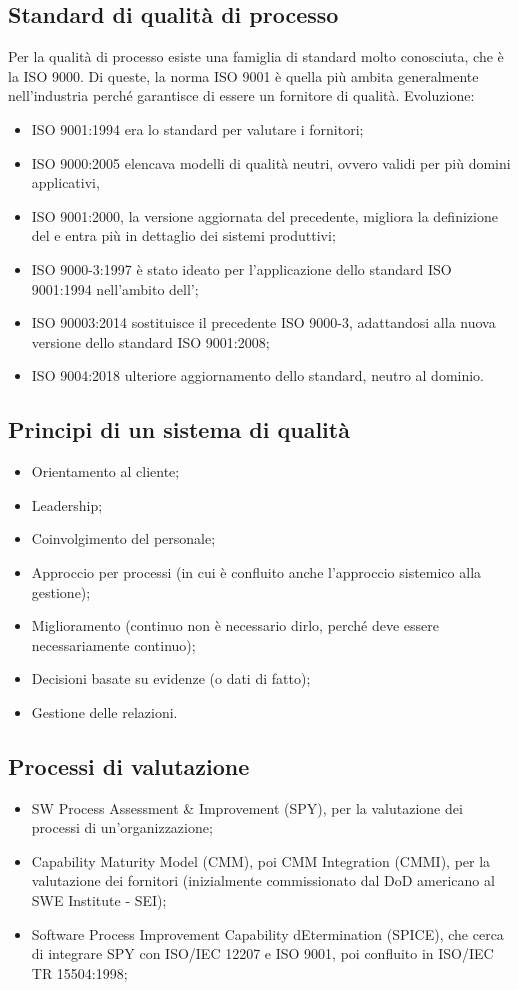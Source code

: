 \documentclass[../main]{subfiles}
\begin{document}
\subsection{Standard di qualità di processo}
Per la qualità di processo esiste una famiglia di standard molto conosciuta, che è la ISO 9000. Di queste, la norma ISO 9001 è quella più ambita generalmente nell'industria perché garantisce di essere un fornitore di qualità.
Evoluzione:
\begin{itemize}
    \item ISO 9001:1994 era lo standard per valutare i fornitori;
    \item ISO 9000:2005 elencava modelli di qualità neutri, ovvero validi per più domini applicativi,
    \item ISO 9001:2000, la versione aggiornata del precedente, migliora la definizione del  e entra più in dettaglio dei sistemi produttivi;
    \item ISO 9000-3:1997 è stato ideato per l'applicazione dello standard ISO 9001:1994 nell'ambito dell';
    \item ISO 90003:2014 sostituisce il precedente ISO 9000-3, adattandosi alla nuova versione dello standard ISO 9001:2008;
    \item ISO 9004:2018 ulteriore aggiornamento dello standard, neutro al dominio.
\end{itemize}
\subsection{Principi di un sistema di qualità}
\begin{itemize}
    \item Orientamento al cliente;
    \item Leadership;
    \item Coinvolgimento del personale;
    \item Approccio per processi (in cui è confluito anche l'approccio sistemico alla gestione);
    \item Miglioramento (continuo non è necessario dirlo, perché deve essere necessariamente continuo);
    \item Decisioni basate su evidenze (o dati di fatto);
    \item Gestione delle relazioni.
\end{itemize}
\subsection{Processi di valutazione}
\begin{itemize}
    \item SW Process Assessment \& Improvement (SPY), per la valutazione dei processi di un'organizzazione;
    \item Capability Maturity Model (CMM), poi CMM Integration (CMMI), per la valutazione dei fornitori (inizialmente commissionato dal DoD americano al SWE Institute - SEI);
    \item Software Process Improvement Capability dEtermination (SPICE), che cerca di integrare SPY con ISO/IEC 12207 e ISO 9001, poi confluito in ISO/IEC TR 15504:1998;
\end{itemize}
\end{document}
